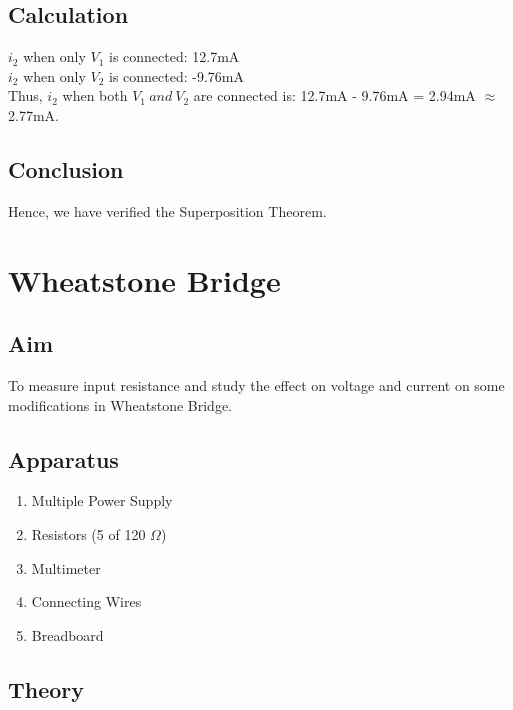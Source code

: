\documentclass{article}
\begin{document}
\subsection{Calculation}
$i_2$ when only $V_1$ is connected: 12.7mA \\
$i_2$ when only $V_2$ is connected: -9.76mA \\

\noindent
Thus, $i_2$ when both $V_1 \ and \ V_2$ are connected is: 12.7mA - 9.76mA =  2.94mA $\approx$ 2.77mA.


\subsection{Conclusion}
Hence, we have verified the Superposition Theorem.

\newpage







\section{Wheatstone Bridge}
\subsection{Aim}
To measure input resistance and study the effect on voltage and current on some modifications in Wheatstone Bridge.

\subsection{Apparatus}
\begin{enumerate}
    \item Multiple Power Supply
    \item Resistors (5 of 120 $\Omega$)
    \item Multimeter
    \item Connecting Wires
    \item Breadboard
\end{enumerate}

\subsection{Theory}

\begin{figure}
\end{figure}
\end{document}
